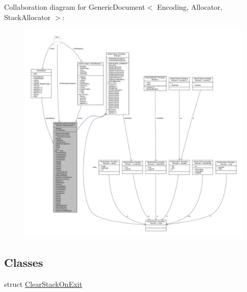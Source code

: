 Collaboration diagram for Generic\+Document$<$ Encoding, Allocator, Stack\+Allocator $>$\+:
\nopagebreak
\begin{figure}[H]
\begin{center}
\leavevmode
\includegraphics[width=350pt]{classGenericDocument__coll__graph}
\end{center}
\end{figure}
\subsection*{Classes}
\begin{DoxyCompactItemize}
\item 
struct \hyperlink{structGenericDocument_1_1ClearStackOnExit}{Clear\+Stack\+On\+Exit}
\end{DoxyCompactItemize}
